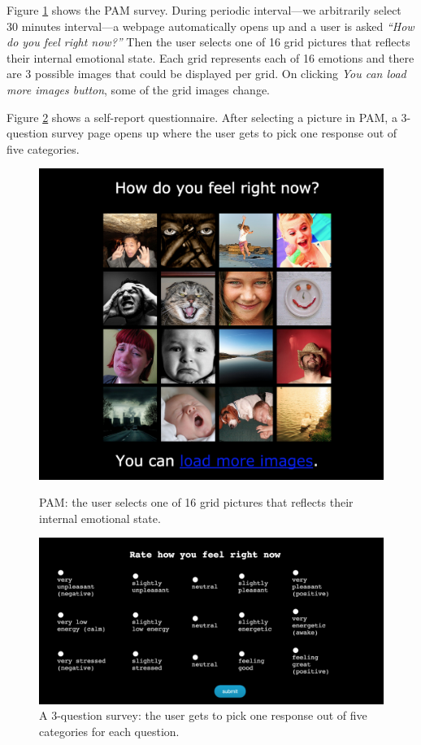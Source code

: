 \documentclass{article}
\begin{document}
Figure \ref{pam} shows the PAM survey. During periodic interval---we arbitrarily select 30 minutes interval---a webpage automatically opens up and a user is asked \textit{``How do you feel right now?''} Then the user selects one of 16 grid pictures that reflects their internal emotional state. Each grid represents each of 16 emotions and there are 3 possible images that could be displayed per grid.  On clicking \textit{You can load more images button}, some of the grid images change.

Figure \ref{ema} shows a self-report questionnaire. After selecting a picture in PAM, a 3-question survey page opens up where the user gets to pick one response out of five categories. 

\begin{figure}[ht]
		\centering
		\includegraphics[width=\columnwidth]{pam}
		\label{pam}
		\caption{PAM: the user selects one of 16 grid pictures that reflects their internal emotional state.} 
		\label{pam}
\end{figure} 

\begin{figure}[ht]
	\vskip 0.2in
	\begin{center}
		\centerline{\includegraphics[width=\columnwidth]{ema}}
		\caption{A 3-question survey: the user gets to pick one response out of five categories for each question. 
		}
		\label{ema}
	\end{center}
	\vskip -0.2in
\end{figure} 
\end{document}
